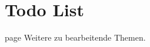 \chapter{Todo List}
\hypertarget{todo}{}\label{todo}

\begin{DoxyRefList}
\item[page \doxylink{index}{New\+Tec Dokumentation} ]\label{todo__todo000001}%
%
Weitere zu bearbeitende Themen.
\end{DoxyRefList}